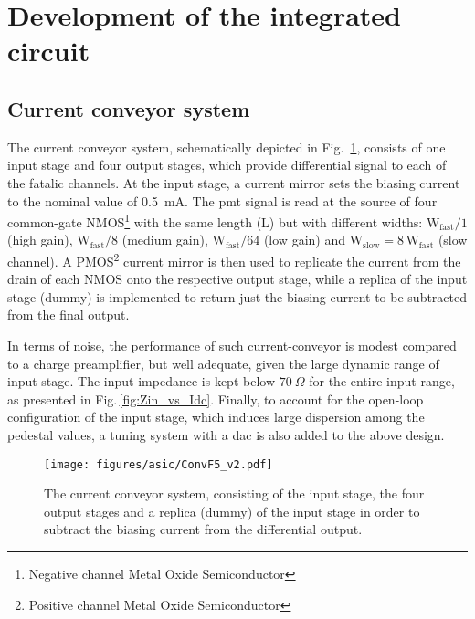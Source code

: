 \clearpage



\section{Development of the integrated circuit}
\label{sec:ASICdev}

\subsection{Current conveyor system}
\label{subsec:Conveyor}

The current conveyor system, schematically depicted in Fig.~\ref{iconv}, consists of one input stage and four output stages, 
which provide differential signal to each of the \gls{fatalic} channels. At the input stage, a current mirror sets the biasing 
current to the nominal value of \SI{0.5}{mA}. The \gls{pmt} signal is read at the source of four common-gate NMOS\footnote{
Negative channel Metal Oxide Semiconductor}
with the same length (L) but with different widths: $\mathrm{W_{fast}/1}$ (high gain), $\mathrm{W_{fast}}/8$ (medium gain), $\mathrm{W_{fast}}/64$ 
(low gain) and $\mathrm{W_{slow}=8\,W_{fast}}$ (slow channel). A PMOS\footnote{
Positive channel Metal Oxide Semiconductor}
current mirror is then used to replicate the current from the drain of each NMOS onto the respective output stage, while a replica of 
the input stage (dummy) is implemented to return just the biasing current to be subtracted from the final output.

In terms of noise, the performance of such current-conveyor is modest compared to a charge preamplifier, but well adequate, 
given the large dynamic range of input stage. The input impedance is kept below $\SI{70}{\Omega}$ for the entire input range, 
as presented in Fig.\,\ref{fig:Zin_vs_Idc}. Finally, to account for the open-loop configuration of the input stage, which 
induces large dispersion among the pedestal values, a tuning system with a \gls{dac} is also added to the above design.

\begin{figure}[b]
	\begin{center}
		\texttt{[image: figures/asic/ConvF5\_v2.pdf]}
		\caption{The current conveyor system, consisting of the input stage, the four output stages and a replica 
        (dummy) of the input stage in order to subtract the biasing current from the differential output.}
		\label{iconv}
	\end{center}
\end{figure}

